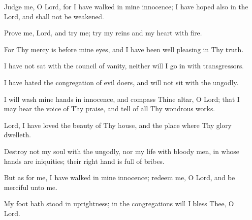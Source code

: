 Judge me, O Lord, for I have walked in mine innocence; I have hoped also in the Lord, and shall not be weakened.

Prove me, Lord, and try me; try my reins and my heart with fire.

For Thy mercy is before mine eyes, and I have been well pleasing in Thy truth.

I have not sat with the council of vanity, neither will I go in with transgressors.

I have hated the congregation of evil doers, and will not sit with the ungodly.

I will wash mine hands in innocence, and compass Thine altar, O Lord; that I may hear the voice of Thy praise, and tell of all Thy wondrous works.

Lord, I have loved the beauty of Thy house, and the place where Thy glory dwelleth.

Destroy not my soul with the ungodly, nor my life with bloody men, in whose hands are iniquities; their right hand is full of bribes.

But as for me, I have walked in mine innocence; redeem me, O Lord, and be merciful unto me.

My foot hath stood in uprightness; in the congregations will I bless Thee, O Lord.
